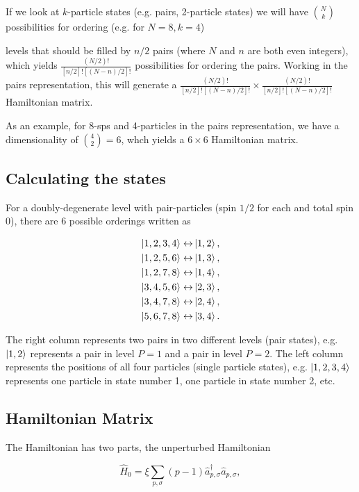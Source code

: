 \documentclass[aps,prl,groupedaddress]{revtex4-1}  %
\begin{document}
If we look at $k$-particle states (e.g. pairs, 2-particle states) we will have ${N \choose k}$ possibilities for ordering (e.g. for $N=8,k=4$)

levels that should be filled by $n/2$ pairs (where $N$ and $n$ are both even integers), which yields $\frac{(N/2)!}{[n/2]![(N-n)/2]!}$ possibilities for ordering the pairs. Working in the pairs representation, this will generate a $\frac{(N/2)!}{[n/2]![(N-n)/2]!}\times\frac{(N/2)!}{[n/2]![(N-n)/2]!}$ Hamiltonian matrix.

As an example, for 8-sps and 4-particles in the pairs representation, we have a dimensionality of ${4 \choose 2}=6$, whch yields a $6\times6$ Hamiltonian matrix.

\subsection{Calculating the states}
For a doubly-degenerate level with pair-particles (spin $1/2$ for each and total spin 0), there are 6 possible orderings written as

\begin{subequations}
\begin{align}
\ket{1,2,3,4} \leftrightarrow &\ket{1,2},\\
\ket{1,2,5,6} \leftrightarrow &\ket{1,3},\\
\ket{1,2,7,8} \leftrightarrow &\ket{1,4},\\
\ket{3,4,5,6} \leftrightarrow &\ket{2,3},\\
\ket{3,4,7,8} \leftrightarrow &\ket{2,4},\\
\ket{5,6,7,8} \leftrightarrow &\ket{3,4}.
\end{align}
\end{subequations}

The right column represents two pairs in two different levels (pair states), e.g. $\ket{1,2}$ represents a pair in level $P=1$ and a pair in level $P=2$. The left column represents the positions of all four particles (single particle states), e.g. $\ket{1,2,3,4}$ represents one particle in state number 1, one particle in state number 2, etc.

\subsection{Hamiltonian Matrix}

The Hamiltonian has two parts, the unperturbed Hamiltonian

\begin{equation}
\hat H_0 = \xi \sum_{p,\sigma} (p-1) \hat a_{p,\sigma}^\dagger \hat a_{p,\sigma},
\label{eq:H_0}
\end{equation}
\end{document}
